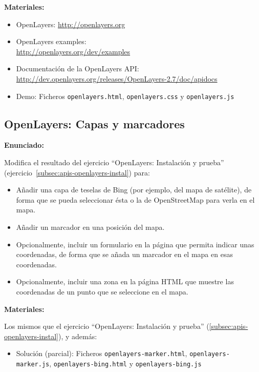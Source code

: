 \textbf{Materiales:}

\begin{itemize}
\item OpenLayers: \url{http://openlayers.org}
\item OpenLayers examples: \\
  \url{http://openlayers.org/dev/examples}
\item Documentación de la OpenLayers API: \\
  \url{http://dev.openlayers.org/releases/OpenLayers-2.7/doc/apidocs}
\item Demo: Ficheros \verb|openlayers.html|, \verb|openlayers.css| y \verb|openlayers.js|
\end{itemize}

\subsection{OpenLayers: Capas y marcadores}
\label{subsec:apis-openlayers-capas}

\textbf{Enunciado:}

Modifica el resultado del ejercicio ``OpenLayers: Instalación y prueba'' (ejercicio~\ref{subsec:apis-openlayers-instal}) para:

\begin{itemize}
\item Añadir una capa de teselas de Bing (por ejemplo, del mapa de satélite), de forma que se pueda seleccionar ésta o la de OpenStreetMap para verla en el mapa.
\item Añadir un marcador en una posición del mapa.
\item Opcionalmente, incluir un formulario en la página que permita indicar unas coordenadas, de forma que se añada un marcador en el mapa en esas coordenadas.
\item Opcionalmente, incluir una zona en la página HTML que muestre las coordenadas de un punto que se seleccione en el mapa.
\end{itemize}

\textbf{Materiales:}

Los mismos que el ejercicio ``OpenLayers: Instalación y prueba'' (\ref{subsec:apis-openlayers-instal}), y además:

\begin{itemize}
\item Solución (parcial): Ficheros \verb|openlayers-marker.html|, \verb|openlayers-marker.js|, \verb|openlayers-bing.html| y \verb|openlayers-bing.js|
\end{itemize}

